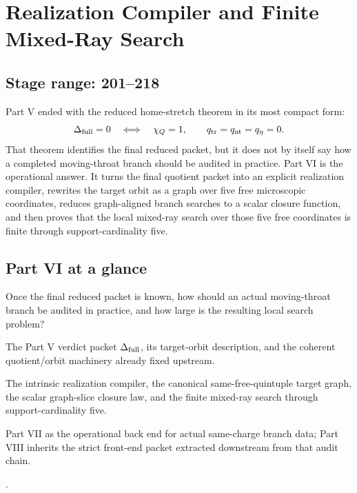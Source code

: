 \chapter{Realization Compiler and Finite Mixed-Ray Search}
\label{chap:part06_realization_compiler}

\section*{Stage range: 201--218}

Part V ended with the reduced home-stretch theorem in its most compact form:
\begin{equation}
\label{eq:part06-intro-full-packet}
\Delta_{\rm full}=0
\quad\Longleftrightarrow\quad
\chi_Q=1,
\qquad
q_{\rm tr}=q_{\rm nt}=q_\eta=0.
\end{equation}
That theorem identifies the final reduced packet, but it does not by itself say how a completed moving-throat branch should be audited in practice.  Part VI is the operational answer.  It turns the final quotient packet into an explicit realization compiler, rewrites the target orbit as a graph over five free microscopic coordinates, reduces graph-aligned branch searches to a scalar closure function, and then proves that the local mixed-ray search over those five free coordinates is finite through support-cardinality five.

\section*{Part VI at a glance}

\begin{readermap}
\item[Primary question] Once the final reduced packet is known, how should an actual moving-throat branch be audited in practice, and how large is the resulting local search problem?
\item[Starting inputs] The Part V verdict packet \(\Delta_{\rm full}\), its target-orbit description, and the coherent quotient/orbit machinery already fixed upstream.
\item[Delivers] The intrinsic realization compiler, the canonical same-free-quintuple target graph, the scalar graph-slice closure law, and the finite mixed-ray search through support-cardinality five.
\item[Used by] Part VII as the operational back end for actual same-charge branch data; Part VIII inherits the strict front-end packet extracted downstream from that audit chain.
\item[Result anchors] .
\end{readermap}

